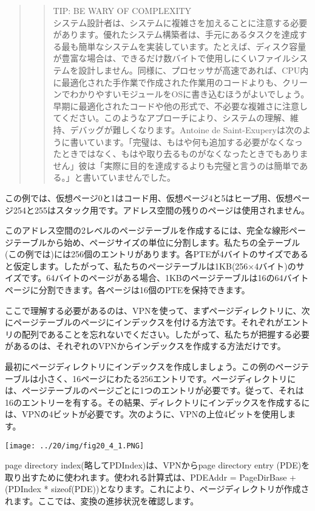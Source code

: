 \begin{quote}
\begin{quote}
TIP: BE WARY OF COMPLEXITY\\
システム設計者は、システムに複雑さを加えることに注意する必要があります。優れたシステム構築者は、手元にあるタスクを達成する最も簡単なシステムを実装しています。たとえば、ディスク容量が豊富な場合は、できるだけ数バイトで使用しにくいファイルシステムを設計しません。同様に、プロセッサが高速であれば、CPU内に最適化された手作業で作成された作業用のコードよりも、クリーンでわかりやすいモジュールをOSに書き込むほうがよいでしょう。早期に最適化されたコードや他の形式で、不必要な複雑さに注意してください。このようなアプローチにより、システムの理解、維持、デバッグが難しくなります。Antoine
de
Saint-Exuperyは次のように書いています。「完璧は、もはや何も追加する必要がなくなったときではなく、もはや取り去るものがなくなったときでもありません」彼は「実際に目的を達成するよりも完璧と言うのは簡単である。」と書いていませんでした。
\end{quote}
\end{quote}

この例では、仮想ページ0と1はコード用、仮想ページ4と5はヒープ用、仮想ページ254と255はスタック用です。アドレス空間の残りのページは使用されません。

このアドレス空間の2レベルのページテーブルを作成するには、完全な線形ページテーブルから始め、ページサイズの単位に分割します。私たちの全テーブル(この例では)には256個のエントリがあります。各PTEが4バイトのサイズであると仮定します。したがって、私たちのページテーブルは1KB(256×4バイト)のサイズです。64バイトのページがある場合、1KBのページテーブルは16の64バイトページに分割できます。各ページは16個のPTEを保持できます。

ここで理解する必要があるのは、VPNを使って、まずページディレクトリに、次にページテーブルのページにインデックスを付ける方法です。それぞれがエントリの配列であることを忘れないでください。したがって、私たちが把握する必要があるのは、それぞれのVPNからインデックスを作成する方法だけです。

最初にページディレクトリにインデックスを作成しましょう。この例のページテーブルは小さく、16ページにわたる256エントリです。ページディレクトリには、ページテーブルのページごとに1つのエントリが必要です。従って、それは16のエントリーを有する。その結果、ディレクトリにインデックスを作成するには、VPNの4ビットが必要です。次のように、VPNの上位4ビットを使用します。

\texttt{[image: ../20/img/fig20\_4\_1.PNG]}

page directory index(略してPDIndex)は、VPNからpage directory entry
(PDE)を取り出すために使われます。使われる計算式は、PDEAddr = PageDirBase
+(PDIndex *
sizeof(PDE))となります。これにより、ページディレクトリが作成されます。ここでは、変換の進捗状況を確認します。

